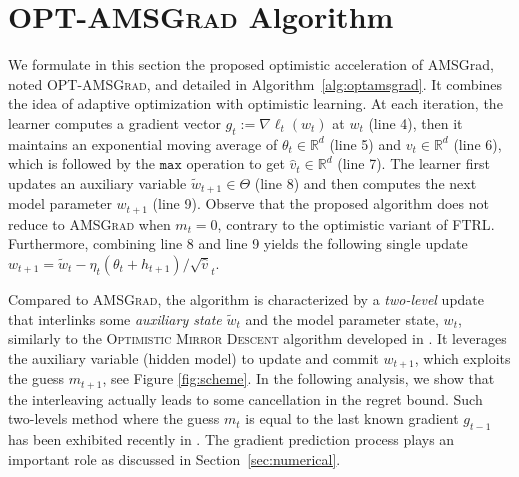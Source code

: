 \documentclass[11pt]{article}
\theoremstyle{k}
\begin{document}
\section{\textsc{OPT-AMSGrad} Algorithm}\label{sec:opt}
\vspace{-0.1in}
We formulate in this section the proposed optimistic acceleration of AMSGrad, noted \textsc{OPT-AMSGrad}, and detailed in Algorithm~\ref{alg:optamsgrad}.  
It combines the idea of adaptive optimization with optimistic learning. 
At each iteration, the learner computes a gradient vector $g_{t}:= \nabla \ell_t( w_t)$ at $w_{t}$ (line 4), then it maintains an exponential moving average of $\theta_{t} \in \mathbb R^{d}$ (line 5) and $v_{t} \in \mathbb R^{d}$ (line 6), which is followed by the $\texttt{max}$ operation to get $\hat{v}_{t} \in \mathbb R^{d}$ (line 7). 
The learner first updates an auxiliary variable $\tilde{w}_{t+1} \in \Theta$ (line 8) and then computes the next model parameter $w_{t+1}$ (line 9).
Observe that the proposed algorithm does not reduce to \textsc{AMSGrad} when $m_{t}=0$, contrary to the optimistic variant of \textsc{FTRL}.
Furthermore, combining line 8 and line 9 yields the following single update $w_{t+1}= \tilde{w}_{t}  - \eta_t (\theta_t + h_{t+1} )/ \sqrt{\hat{v}}_t $. 

Compared to \textsc{AMSGrad}, the algorithm is characterized by a \emph{two-level} update that interlinks some \emph{auxiliary state} $\tilde{w}_{t}$ and the model parameter state, $w_t$, similarly to the \textsc{Optimistic Mirror Descent} algorithm developed in \citep{rakhlin2013online}.
It leverages the auxiliary variable (hidden model) to update and commit $w_{t+1}$, which exploits the guess $m_{t+1}$, see Figure \ref{fig:scheme}.
In the following analysis, we show that the interleaving actually leads to some cancellation in the regret bound.
Such two-levels method where the guess $m_t$ is equal to the last known gradient $g_{t-1}$ has been exhibited recently in \citep{CJ12}.
The gradient prediction process plays an important role as discussed in Section~\ref{sec:numerical}.
\end{document}
